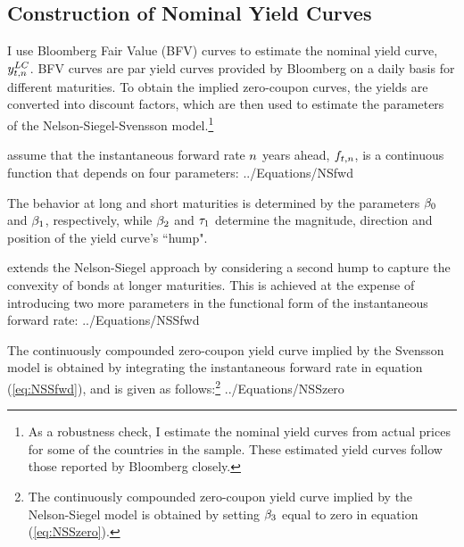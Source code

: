 {\subsection{Construction of Nominal Yield Curves}
I use Bloomberg Fair Value (BFV) curves to estimate the nominal yield curve, $y_{t,n} ^{LC}$. BFV curves are par yield curves provided by Bloomberg on a daily basis for different maturities. To obtain the implied zero-coupon curves, the yields are converted into discount factors, which are then used to estimate the parameters of the Nelson-Siegel-Svensson model.\footnote{As a robustness check, I estimate the nominal yield curves from actual prices for some of the countries in the sample. These estimated yield curves follow those reported by Bloomberg closely.}


\cite{NelsonSiegel:1987} assume that the instantaneous forward rate $n$ years ahead, $f_{t,n}$, is a continuous function that depends on four parameters:
	 {../Equations/NSfwd}

The behavior at long and short maturities is determined by the parameters $\beta_{0}$ and $\beta_{1}$, respectively, while $\beta_{2}$ and $\tau_{1}$ determine the magnitude, direction and position of the yield curve's ``hump".

\cite{Svensson:1994} extends the Nelson-Siegel approach by considering a second hump to capture the convexity of bonds at longer maturities. This is achieved at the expense of introducing two more parameters in the functional form of the instantaneous forward rate:
	 {../Equations/NSSfwd}

The continuously compounded zero-coupon yield curve implied by the Svensson model is obtained by integrating the instantaneous forward rate in equation (\ref{eq:NSSfwd}), and is given as follows:\footnote{The continuously compounded zero-coupon yield curve implied by the Nelson-Siegel model is obtained by setting $\beta_{3}$ equal to zero in equation (\ref{eq:NSSzero}).}
	 {../Equations/NSSzero}

}

